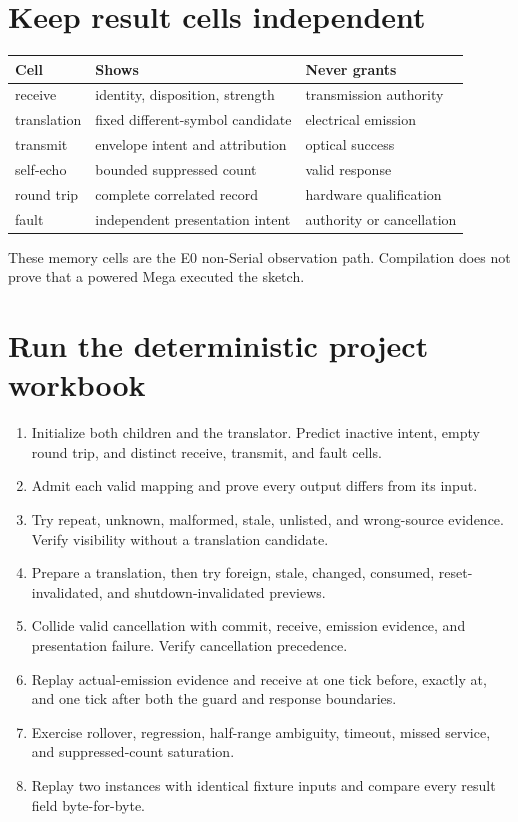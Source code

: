 \documentclass[10pt]{article}
\begin{document}
\section{Keep result cells independent}
\begin{tabularx}{\linewidth}{@{}l X X@{}}
\toprule
Cell & Shows & Never grants\\
\midrule
receive & identity, disposition, strength & transmission authority\\
translation & fixed different-symbol candidate & electrical emission\\
transmit & envelope intent and attribution & optical success\\
self-echo & bounded suppressed count & valid response\\
round trip & complete correlated record & hardware qualification\\
fault & independent presentation intent & authority or cancellation\\
\bottomrule
\end{tabularx}

These memory cells are the E0 non-Serial observation path. Compilation does
not prove that a powered Mega executed the sketch.

\section{Run the deterministic project workbook}
\begin{enumerate}
 \item Initialize both children and the translator. Predict inactive intent,
       empty round trip, and distinct receive, transmit, and fault cells.
 \item Admit each valid mapping and prove every output differs from its input.
 \item Try repeat, unknown, malformed, stale, unlisted, and wrong-source
       evidence. Verify visibility without a translation candidate.
 \item Prepare a translation, then try foreign, stale, changed, consumed,
       reset-invalidated, and shutdown-invalidated previews.
 \item Collide valid cancellation with commit, receive, emission evidence,
       and presentation failure. Verify cancellation precedence.
 \item Replay actual-emission evidence and receive at one tick before, exactly
       at, and one tick after both the guard and response boundaries.
 \item Exercise rollover, regression, half-range ambiguity, timeout, missed
       service, and suppressed-count saturation.
 \item Replay two instances with identical fixture inputs and compare every
       result field byte-for-byte.
\end{enumerate}
\end{document}
